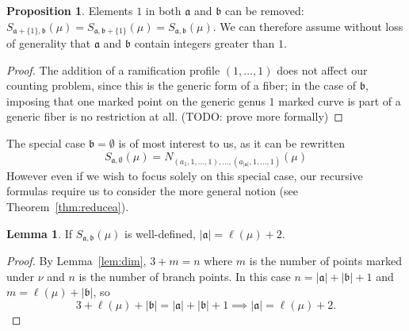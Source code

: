 \documentclass[11pt]{article}           %
\renewcommand{\a}{\mathfrak a}
\renewcommand{\b}{\mathfrak b}
\theoremstyle{definition}
\newtheorem{prop}{Proposition}[section]
\newtheorem{lem}{Lemma}[section]
\begin{document}
\begin{prop}
  Elements $1$ in both $\a$ and $\b$ can be removed:
  $S_{\a+\{1\},\b}(\mu)=S_{\a,\b+\{1\}}(\mu)=S_{\a,\b}(\mu)$.
  We can therefore assume without loss of generality that $\a$
  and $\b$ contain integers greater than $1$.
\end{prop}
\begin{proof}
  The addition of a ramification profile $(1,\dots,1)$ does not affect
  our counting problem, since this is the generic form of a fiber;
  in the case of $\b$, imposing that one marked point on the
  generic genus $1$
  marked curve is part of a generic fiber is no restriction at all.
  (TODO: prove more formally)
  \end{proof}

The special case $\b=\emptyset$ is of most interest to us, as it can be rewritten
\[
S_{\a,\emptyset}(\mu)=N_{(a_1,1,\dots,1),\dots,(a_{|\a|},1,\dots,1)}(\mu)
\]
However even if we wish to focus solely on this special case, our
recursive formulas require us to consider the more general notion (see
Theorem~\ref{thm:reducea}).



\begin{lem}
  \label{lem:Sabdim}
  If $S_{\mathfrak a,\mathfrak b}(\mu)$ is well-defined, $|\mathfrak a|=\ell(\mu)+2$.
\end{lem}
\begin{proof}
  By Lemma~\ref{lem:dim}, $3+m=n$ where $m$ is the number of points marked under $\nu$ and
  $n$ is the number of branch points. In this case $n=|\mathfrak a|+|\mathfrak b|+1$
  and $m=\ell(\mu)+|\mathfrak b|$, so
  \[
  3+\ell(\mu)+|\mathfrak b|=|\mathfrak a|+|\mathfrak b|+1\implies |\mathfrak a|=\ell(\mu)+2.
  \]
\end{proof}
\end{document}
